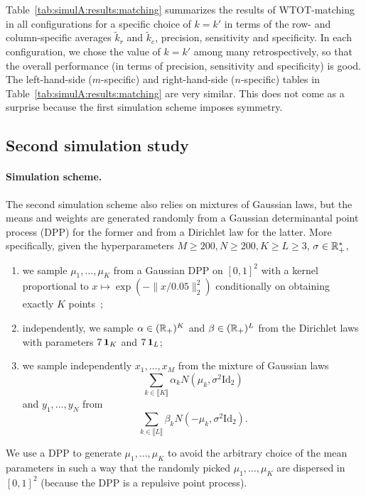 \begin{description}
  Table~\ref{tab:simulA:results:matching}    summarizes    the   results    of
  WTOT-matching in all configurations for a specific choice of $k=k'$ in terms
  of the  row- and  column-specific averages $\tilde{k}_r$  and $\tilde{k}_c$,
  precision, sensitivity and specificity.  In each configuration, we chose the
  value of $k=k'$ among many  retrospectively, so that the overall performance
  (in  terms  of  precision,  sensitivity   and  specificity)  is  good.   The
  left-hand-side ($m$-specific)  and right-hand-side ($n$-specific)  tables in
  Table~\ref{tab:simulA:results:matching}  are very  similar.   This does  not
  come as a surprise because the first simulation scheme imposes symmetry.
\end{description}



\subsection{Second simulation study}
\label{subsec:simul:B}

\paragraph*{Simulation scheme.}

The second simulation scheme also relies on mixtures of Gaussian laws, but the
means and weights  are generated randomly from a  Gaussian determinantal point
process (DPP) for  the former and from  a Dirichlet law for  the latter.  More
specifically,              given              the              hyperparameters
$M \geq 200, N \geq 200, K \geq L\geq 3$, $\sigma \in \mathbb{R}_{+}^{*}$,
\begin{enumerate}
\item we sample $\mu_{1}, \ldots, \mu_{K}$  from a Gaussian DPP on $[0,1]^{2}$
  with  a   kernel  proportional  to  $x   \mapsto  \exp(-\|x/0.05\|_{2}^{2})$
  conditionally on obtaining exactly $K$ points~\cite{Lavancier2015,spatstat};
\item   independently,    we   sample   $\alpha   \in    (\mathbb{R}_{+})^{K}$   and
  $\beta  \in   (\mathbb{R}_{+})^{L}$  from  the  Dirichlet   laws  with  parameters
  $7 \operatorname{\textbf{1}}_{K}$ and $7 \operatorname{\textbf{1}}_{L}$;
\item  we sample  independently $x_{1},  \ldots,  x_{M}$ from  the mixture  of
  Gaussian laws
  \begin{equation*}
    \sum_{k\in \llbracket K\rrbracket} \alpha_k N(\mu_k, \sigma^{2} \text{Id}_{2})
  \end{equation*}
  and $y_{1}, \ldots, y_{N}$ from
  \begin{equation*}
    \sum_{k\in\llbracket L\rrbracket} \beta_k N(-\mu_k, \sigma^{2} \text{Id}_{2}).
  \end{equation*}
\end{enumerate}
We use  a DPP to  generate $\mu_{1}, \ldots,  \mu_{K}$ to avoid  the arbitrary
choice  of  the  mean parameters  in  such  a  way  that the  randomly  picked
$\mu_{1}, \ldots, \mu_{K}$ are dispersed in  $[0,1]^{2}$ (because the DPP is a
repulsive point process).

